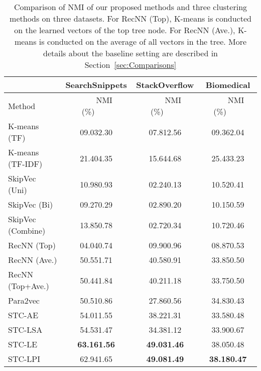 \documentclass[review]{elsarticle}
\begin{document}
\begin{table*}[t] \begin{center}
\begin{tabular}{|l|c|c|c|}\hline
&SearchSnippets &StackOverflow &Biomedical\\\hline
Method      &~~~~NMI (\%)~~~~&~~~~NMI (\%)~~~~&~~~~NMI (\%)~~~~\\\hline \hline
K-means (TF)   &	09.032.30    & 07.812.56  &09.362.04    \\
K-means (TF-IDF)   &	21.404.35    & 15.644.68   &25.433.23 \\
SkipVec (Uni) & 10.980.93           & 02.240.13  & 10.520.41 \\
SkipVec (Bi)  & 09.270.29           & 02.890.20  & 10.150.59 \\
SkipVec (Combine)  & 13.850.78      & 02.720.34  & 10.720.46 \\
RecNN (Top) 	&04.040.74		&09.900.96   &08.870.53\\
RecNN (Ave.) 	&50.551.71		&40.580.91   &33.850.50\\
RecNN (Top+Ave.) &50.441.84	&40.211.18   &33.750.50\\
Para2vec & 50.510.86	&27.860.56	  &34.830.43\\
\hline
STC-AE&	54.011.55 & 38.221.31 &33.580.48\\
STC-LSA&	54.531.47	& 34.381.12   &33.900.67\\
STC-LE&	{\bf{63.161.56}}	& {\bf{49.031.46}}  &38.050.48\\
STC-LPI&	62.941.65	& {\bf{49.081.49}} &{\bf{38.180.47}}\\\hline

\end{tabular}
\end{center}
\caption{\label{tb:ComparisonNMI} Comparison of NMI of our proposed methods and three clustering methods on three datasets. For RecNN (Top), K-means is conducted on the learned vectors of the top tree node. For RecNN (Ave.), K-means is conducted on the average of all vectors in the tree. More details about the baseline setting are described in Section~\ref{sec:Comparisons}}
\end{table*}
\end{document}
